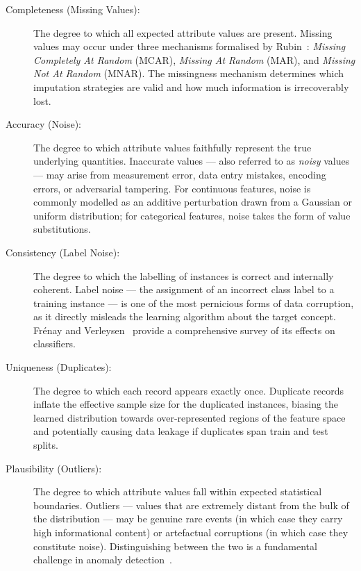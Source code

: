 \begin{description}
    \item[Completeness (Missing Values):] The degree to which all expected
        attribute values are present.  Missing values may occur under three
        mechanisms formalised by Rubin~\cite{rubin1976inference}: \emph{Missing
        Completely At Random} (MCAR), \emph{Missing At Random} (MAR), and
        \emph{Missing Not At Random} (MNAR).  The missingness mechanism
        determines which imputation strategies are valid and how much
        information is irrecoverably lost.

    \item[Accuracy (Noise):] The degree to which attribute values faithfully
        represent the true underlying quantities.  Inaccurate values — also
        referred to as \emph{noisy} values — may arise from measurement error,
        data entry mistakes, encoding errors, or adversarial tampering.  For
        continuous features, noise is commonly modelled as an additive
        perturbation drawn from a Gaussian or uniform distribution; for
        categorical features, noise takes the form of value substitutions.

    \item[Consistency (Label Noise):] The degree to which the labelling of
        instances is correct and internally coherent.  Label noise — the
        assignment of an incorrect class label to a training instance — is one
        of the most pernicious forms of data corruption, as it directly
        misleads the learning algorithm about the target concept.
        Fr\'{e}nay and Verleysen~\cite{frenay2014classification} provide a
        comprehensive survey of its effects on classifiers.

    \item[Uniqueness (Duplicates):] The degree to which each record appears
        exactly once.  Duplicate records inflate the effective sample size for
        the duplicated instances, biasing the learned distribution towards
        over-represented regions of the feature space and potentially causing
        data leakage if duplicates span train and test splits.

    \item[Plausibility (Outliers):] The degree to which attribute values fall
        within expected statistical boundaries.  Outliers — values that are
        extremely distant from the bulk of the distribution — may be genuine
        rare events (in which case they carry high informational content) or
        artefactual corruptions (in which case they constitute noise).
        Distinguishing between the two is a fundamental challenge in anomaly
        detection~\cite{chandola2009anomaly}.
\end{description}

